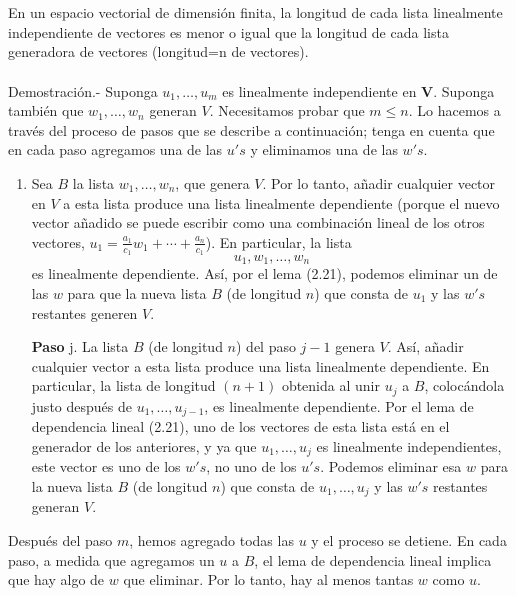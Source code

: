 \setcounter{myteo}{22}
\begin{myteo}\;\\\\
    En un espacio vectorial de dimensión finita, la longitud de cada lista linealmente independiente de vectores es menor o igual que la longitud de cada lista generadora de vectores (longitud=n de vectores).\\\\ 
    Demostración.-\; Suponga $u_1,\ldots,u_m$ es linealmente independiente en $\textbf{V}$. Suponga también que $w_1,\ldots,w_n$ generan $V$. Necesitamos probar que $m\leq n$. Lo hacemos a través del proceso de pasos que se describe a continuación; tenga en cuenta que en cada paso agregamos una de las $u's$ y eliminamos una de las $w's$.

    \begin{enumerate}
	\item Sea $B$ la lista $w_1,\ldots,w_n$, que genera $V$. Por lo tanto, añadir cualquier vector en $V$ a esta lista produce una lista linealmente dependiente (porque el nuevo vector añadido se puede escribir como una combinación lineal de los otros vectores, $u_1=\frac{a_1}{c_1}w_1+\cdots+\frac{a_n}{c_1}$). En particular, la lista
	$$u_1,w_1,\ldots,w_n$$
	es linealmente dependiente. Así, por el lema (2.21), podemos eliminar un de las $w$ para que la nueva lista $B$ (de longitud $n$) que consta de $u_1$ y las $w's$ restantes generen $V$.
	\item[\textbf{Paso} j.] La lista $B$ (de longitud $n$) del paso $j-1$ genera $V$. Así, añadir cualquier vector a esta lista produce una lista linealmente dependiente. En particular, la lista de longitud $(n+1)$ obtenida al unir $u_j$ a $B$, colocándola justo después de $u_1,\ldots,u_{j-1}$, es linealmente dependiente. Por el lema de dependencia lineal (2.21), uno de los vectores de esta lista está en el generador de los anteriores, y ya que $u_1,\ldots,u_j$ es linealmente independientes, este vector es uno de los $w's$, no uno de los $u's$. Podemos eliminar esa $w$ para la nueva lista $B$ (de longitud $n$) que consta de $u_1,\ldots,u_j$ y las $w's$ restantes generan $V$.
    \end{enumerate}
    Después del paso $m$, hemos agregado todas las $u$ y el proceso se detiene. En cada paso, a medida que agregamos un $u$ a $B$, el lema de dependencia lineal implica que hay algo de $w$ que eliminar. Por lo tanto, hay al menos tantas $w$ como $u$.
\end{myteo}

